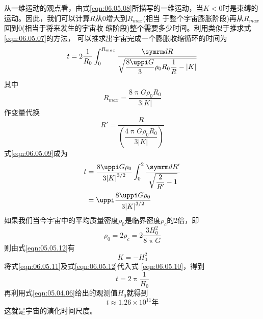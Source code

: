 从一维运动的观点看，由式\eqref{eqn:06.05.08}所描写的一维运动，当$ K
<0 $时是束缚的运动。因此，我们可以计算$ R $从0增大到$ R_{max} $(相当
于整个宇宙膨胀阶段)再从$ R_{max} $回到0(相当于将来发生的宇宙收
缩阶段)整个需要多少时间。利用类似于推求式\eqref{eqn:06.05.07}的方法，
可以推求出宇宙完成一个膨胀收缩循环的时间为
\begin{equation}\label{eqn:06.05.09}
    t = 2 \frac { 1 } { R _ { 0 } } \int _ 0 ^ { R _ { max } } \frac { \dif R } { \sqrt { \dfrac { 8 \uppi G } { 3 } \rho _ { 0 } R _ { 0 } \dfrac { 1 } { R } - | K | } }
\end{equation}
其中
\begin{equation*}
    R _ { max } = \frac { 8 \uppi G \rho _ { 0 } R _ { 0 } } { 3 | K | }
\end{equation*}
作变量代换
\begin{equation*}
    R ' = \frac { R } { \left( \dfrac { 4 \uppi G \rho _ { 0 } R _ { 0 } } { 3 | K | } \right) }
\end{equation*}
式\eqref{eqn:06.05.09}成为
\begin{equation}\label{eqn:06.05.10}
    \begin{aligned}
        t &= \frac { 8 \uppi G \rho _ { 0 } } { 3 { | K | } ^ { 3 / 2 } } \int _ { 0 } ^ { 2 } \frac { \dif R '  } { \sqrt { \dfrac { 2 } { R ' } - 1 } }  \\
            &= \uppi \frac { 8 \uppi G \rho _ { 0 } } { 3 { | K | } ^ { 3 / 2 } }
            \end{aligned}
        \end{equation}
如果我们当今宇宙中的平均质量密度$ \rho _ 0 $是临界密度$ \rho _ c $的2倍，即\vspace{-1.56em}
\begin{equation}\label{eqn:06.05.11}
    \rho _ { 0 } = 2 \rho _ { c } = 2 \frac { 3 H _ 0 ^ { 2 } } { 8 \uppi G }
\end{equation}
则由式\eqref{eqn:05.05.12}有
\begin{equation}\label{eqn:06.05.12}
    K = - H _ { 0 } ^ { 2 }
\end{equation}
将式\eqref{eqn:06.05.11}及式\eqref{eqn:06.05.12}代入式 \eqref{eqn:06.05.10}，得到
\begin{equation}\label{eqn:06.05.13}
    t = 2 \uppi \frac { 1 } { H _ { 0 } }
\end{equation}
再利用式\eqref{eqn:05.04.06}给出的观测值$ H _ { 0 } $就得到
\begin{equation*}
    t \approx 1.26 \times 10 ^ { 11 } \text{年}
\end{equation*}
这就是宇宙的演化时间尺度。